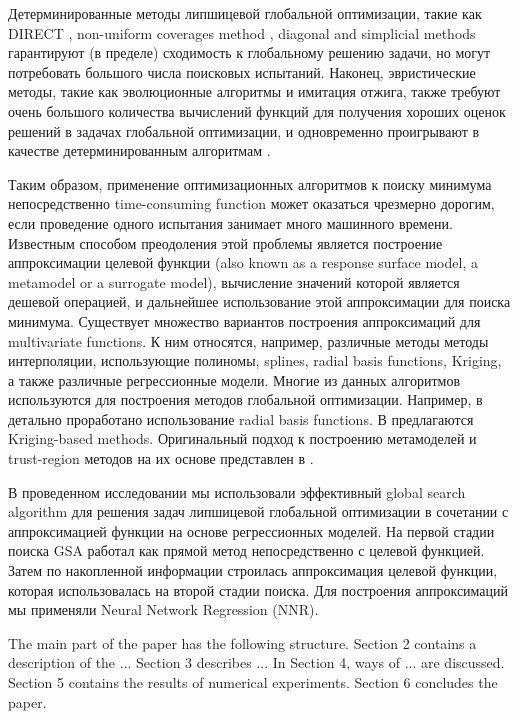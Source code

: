 \documentclass[sensors,article,submit,moreauthors,pdftex]{Definitions/mdpi}
\begin{document}
Детерминированные методы липшицевой глобальной оптимизации, такие как DIRECT \cite{Jones2009}, non-uniform coverages method \cite{Evtushenko2009,Evtushenko2013}, diagonal \cite{Sergeyev2017} and simplicial \cite{Zilinskas2014} methods гарантируют (в пределе) сходимость к глобальному решению задачи, но могут потребовать большого числа поисковых испытаний.
Наконец, эвристические методы, такие как эволюционные алгоритмы и имитация отжига, также требуют очень большого количества вычислений функций для получения хороших оценок решений в задачах глобальной оптимизации, и одновременно проигрывают в качестве  детерминированным алгоритмам \cite{Sergeyev2018,Kvasov2018}.

Таким образом, применение оптимизационных алгоритмов к поиску минимума непосредственно time-consuming function может оказаться чрезмерно дорогим, если проведение одного испытания занимает много машинного времени.
 Известным способом преодоления этой проблемы является построение аппроксимации целевой функции (also known as a response surface model, a metamodel or a surrogate model), вычисление значений которой является дешевой операцией, и дальнейшее использование этой аппроксимации для поиска минимума. 
Существует множество вариантов построения аппроксимаций для multivariate functions. К ним относятся, например, различные методы методы интерполяции, использующие полиномы, splines, radial basis functions, Kriging, а также различные регрессионные модели. Многие из данных алгоритмов используются для построения методов глобальной оптимизации. 
Например, в \cite{Gutmann2001,Regis2005} детально проработано использование radial basis functions. В \cite{Jones1998,UrRehman2014,Ollar2017_1} предлагаются Kriging-based methods. Оригинальный подход к построению метамоделей и trust-region методов на их основе представлен в \cite{Polynkin2012,Ollar2017_2,Toropov2018}. 

В проведенном исследовании мы использовали эффективный global search algorithm \cite{Strongin2000,Sergeyev2013} для решения задач липшицевой глобальной оптимизации в сочетании с аппроксимацией функции на основе регрессионных моделей. На первой стадии поиска GSA работал как прямой метод непосредственно с целевой функцией. Затем по накопленной информации строилась аппроксимация целевой функции, которая использовалась на второй стадии поиска.
Для построения аппроксимаций мы применяли Neural Network Regression (NNR). 

The main part of the paper has the following structure. 
Section 2 contains a description of the ... 
Section 3 describes ... 
In Section 4, ways of ... are discussed. 
Section 5 contains the results of numerical experiments. 
Section 6 concludes the paper.
\end{document}
